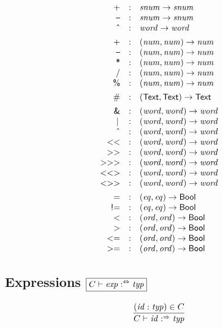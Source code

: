 $$
\begin{array}{@{}rcl@{}}
\K{+} &:& \x{snum} \Kto \x{snum} \\
\K\textendash &:& \x{snum} \Kto \x{snum} \\
\K{\^{}} &:& \x{word} \Kto \x{word} \\
[1ex]
\K{+} &:& (\x{num}, \x{num}) \Kto \x{num} \\
\K\textendash &:& (\x{num}, \x{num}) \Kto \x{num} \\
\K* &:& (\x{num}, \x{num}) \Kto \x{num} \\
\K/ &:& (\x{num}, \x{num}) \Kto \x{num} \\
\K\% &:& (\x{num}, \x{num}) \Kto \x{num} \\
[1ex]
\K{\#{}} &:& (\K{Text}, \K{Text}) \Kto \K{Text} \\
[1ex]
\K{\&} &:& (\x{word}, \x{word}) \Kto \x{word} \\
\K{\textbar}\, &:& (\x{word}, \x{word}) \Kto \x{word} \\
\K{\^{}} &:& (\x{word}, \x{word}) \Kto \x{word} \\
\Klt\Klt &:& (\x{word}, \x{word}) \Kto \x{word} \\
\Kgt\Kgt &:& (\x{word}, \x{word}) \Kto \x{word} \\
\Kgt\Kgt\Kgt &:& (\x{word}, \x{word}) \Kto \x{word} \\
\Klt\Klt\Kgt &:& (\x{word}, \x{word}) \Kto \x{word} \\
\Klt\Kgt\Kgt &:& (\x{word}, \x{word}) \Kto \x{word} \\
[1ex]
\K{=} &:& (\x{eq}, \x{eq}) \Kto \K{Bool} \\
\K{!=} &:& (\x{eq}, \x{eq}) \Kto \K{Bool} \\
\Klt &:& (\x{ord}, \x{ord}) \Kto \K{Bool} \\
\Kgt &:& (\x{ord}, \x{ord}) \Kto \K{Bool} \\
{\Klt}{\K=} &:& (\x{ord}, \x{ord}) \Kto \K{Bool} \\
{\Kgt}{\K=} &:& (\x{ord}, \x{ord}) \Kto \K{Bool} \\
\end{array}
$$


\subsection*{Expressions \hfill $\boxed{C \vdash \x{exp} \analsynth \x{typ}}$}

$$
\frac{
  (\x{id} : \x{typ}) \in C
}{
  C \vdash \x{id} \synth \x{typ}
}
$$


